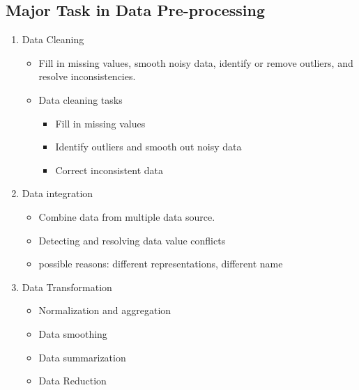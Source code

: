     
\subsection{Major Task in Data Pre-processing}    
\begin{enumerate}
\item Data Cleaning
	\begin{itemize}
	\item Fill in missing values, smooth noisy data, identify or remove outliers, and resolve 		inconsistencies.
	\item Data cleaning tasks
		\begin{itemize} 	
		\item Fill in missing values
		\item Identify outliers and smooth out noisy data 
		\item Correct inconsistent data	
		\end{itemize}
	\end{itemize}
 	
\item Data integration	
	\begin{itemize}
	\item Combine data from multiple data source.
	\item Detecting and resolving data value conflicts
	\item possible reasons: different representations, different name
	\end{itemize}
   
\item Data Transformation
	\begin{itemize}
	\item Normalization and aggregation
	\item Data smoothing
	\item Data summarization
	\item Data Reduction
	\end{itemize}
\end{enumerate}


